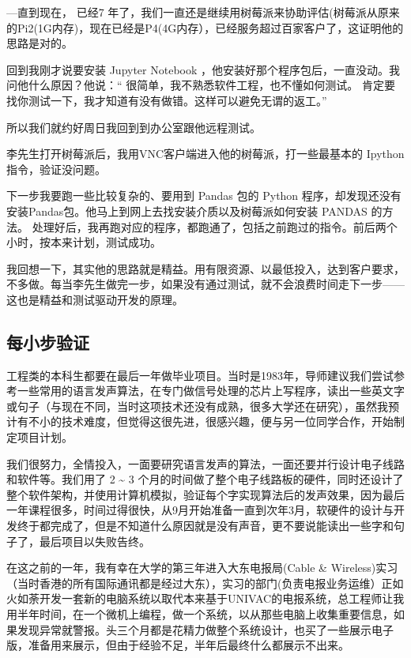 ---直到现在， 已经7
年了，我们一直还是继续用树莓派来协助评估(树莓派从原来的Pi2(1G内存)，现在已经是P4(4G内存），已经服务超过百家客户了，这证明他的思路是对的。

回到我刚才说要安装 Jupyter Notebook
，他安装好那个程序包后，一直没动。我问他什么原因？他说：``
很简单，我不熟悉软件工程，也不懂如何测试。
肯定要找你测试一下，我才知道有没有做错。这样可以避免无谓的返工。''

所以我们就约好周日我回到到办公室跟他远程测试。

李先生打开树莓派后，我用VNC客户端进入他的树莓派，打一些最基本的 Ipython
指令，验证没问题。

下一步我要跑一些比较复杂的、要用到 Pandas 包的 Python
程序，却发现还没有安装Pandas包。他马上到网上去找安装介质以及树莓派如何安装
PANDAS 的方法。
处理好后，我再跑对应的程序，都跑通了，包括之前跑过的指令。前后两个小时，按本来计划，测试成功。

我回想一下，其实他的思路就是精益。用有限资源、以最低投入，达到客户要求，不多做。每当李先生做完一步，如果没有通过测试，就不会浪费时间走下一步------这也是精益和测试驱动开发的原理。

\hypertarget{ux6bcfux5c0fux6b65ux9a8cux8bc1}{%
\subsection{每小步验证}\label{ux6bcfux5c0fux6b65ux9a8cux8bc1}}

工程类的本科生都要在最后一年做毕业项目。当时是1983年，导师建议我们尝试参考一些常用的语言发声算法，在专门做信号处理的芯片上写程序，读出一些英文字或句子（与现在不同，当时这项技术还没有成熟，很多大学还在研究），虽然我预计有不小的技术难度，但觉得这很先进，很感兴趣，便与另一位同学合作，开始制定项目计划。

我们很努力，全情投入，一面要研究语言发声的算法，一面还要并行设计电子线路和软件等。我们用了
2 \textasciitilde{} 3
个月的时间做了整个电子线路板的硬件，同时还设计了整个软件架构，并使用计算机模拟，验证每个字实现算法后的发声效果，因为最后一年课程很多，时间过得很快，从9月开始准备一直到次年3月，软硬件的设计与开发终于都完成了，但是不知道什么原因就是没有声音，更不要说能读出一些字和句子了，最后项目以失败告终。

在这之前的一年，我有幸在大学的第三年进入大东电报局(Cable \&
Wireless)实习（当时香港的所有国际通讯都是经过大东），实习的部门(负责电报业务运维）正如火如荼开发一套新的电脑系统以取代本来基于UNIVAC的电报系统，总工程师让我用半年时间，在一个微机上编程，做一个系统，以从那些电脑上收集重要信息，如果发现异常就警报。头三个月都是花精力做整个系统设计，也买了一些展示电子版，准备用来展示，但由于经验不足，半年后最终什么都展示不出来。

